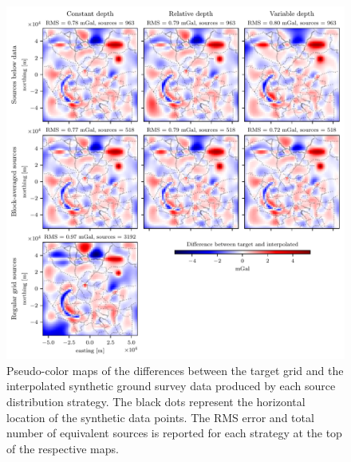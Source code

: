 \documentclass[twocolumn]{article}
\begin{document}
\begin{figure}
    \includegraphics[width=\linewidth]{figs/ground_survey_differences.pdf}
    \caption{
        Pseudo-color maps of the differences between the target grid and the
        interpolated synthetic ground survey data produced by each source
        distribution strategy.
        The black dots represent the horizontal location of the synthetic data
        points. The RMS error and total number of equivalent sources is
        reported for each strategy at the top of the respective maps.
    }
    \label{fig:ground-survey-differences}
\end{figure}
\end{document}
